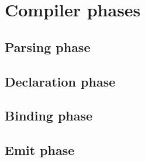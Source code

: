 \section{Compiler phases}
\label{sec:compiler-phases}


\subsection{Parsing phase}
\label{sec:parsing-phase}

\subsection{Declaration phase}
\label{sec:declaration-phase}

\subsection{Binding phase}
\label{sec:binding-phase}

\subsection{Emit phase}
\label{sec:emit-phase}